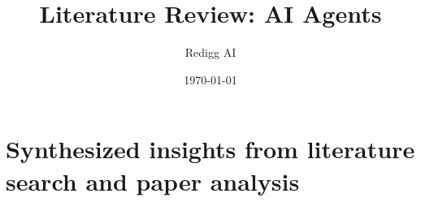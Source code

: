\documentclass[12pt,a4paper]{article}
\title{Literature Review: AI Agents}
\author{Redigg AI}
\date{\today}
\begin{document}
\maketitle

\section{Synthesized insights from literature search and paper analysis}
\end{document}
